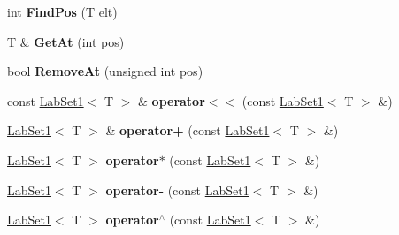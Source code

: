 \begin{DoxyCompactItemize}
\item 
\hypertarget{classelps_1_1_lab_set1_afef2b2ba8157540f4308226054863913}{int {\bfseries Find\+Pos} (T elt)}\label{classelps_1_1_lab_set1_afef2b2ba8157540f4308226054863913}

\item 
\hypertarget{classelps_1_1_lab_set1_a5757cfe7e367a9abeb16cf1055ca7fee}{T \& {\bfseries Get\+At} (int pos)}\label{classelps_1_1_lab_set1_a5757cfe7e367a9abeb16cf1055ca7fee}

\item 
\hypertarget{classelps_1_1_lab_set1_ae8cc5a4eac6599c8374c8fbc97027f33}{bool {\bfseries Remove\+At} (unsigned int pos)}\label{classelps_1_1_lab_set1_ae8cc5a4eac6599c8374c8fbc97027f33}

\item 
\hypertarget{classelps_1_1_lab_set1_a4200ac9d614a09674ee15258ce995864}{const \hyperlink{classelps_1_1_lab_set1}{Lab\+Set1}$<$ T $>$ \& {\bfseries operator$<$$<$} (const \hyperlink{classelps_1_1_lab_set1}{Lab\+Set1}$<$ T $>$ \&)}\label{classelps_1_1_lab_set1_a4200ac9d614a09674ee15258ce995864}

\item 
\hypertarget{classelps_1_1_lab_set1_ab0f93815f027d90c2c34497ab407bfe1}{\hyperlink{classelps_1_1_lab_set1}{Lab\+Set1}$<$ T $>$ \& {\bfseries operator+} (const \hyperlink{classelps_1_1_lab_set1}{Lab\+Set1}$<$ T $>$ \&)}\label{classelps_1_1_lab_set1_ab0f93815f027d90c2c34497ab407bfe1}

\item 
\hypertarget{classelps_1_1_lab_set1_a6e3f33c756193d7f09ba46e2493df7b7}{\hyperlink{classelps_1_1_lab_set1}{Lab\+Set1}$<$ T $>$ {\bfseries operator$\ast$} (const \hyperlink{classelps_1_1_lab_set1}{Lab\+Set1}$<$ T $>$ \&)}\label{classelps_1_1_lab_set1_a6e3f33c756193d7f09ba46e2493df7b7}

\item 
\hypertarget{classelps_1_1_lab_set1_ae4287f8b612e0bb18efac72dbeb23b40}{\hyperlink{classelps_1_1_lab_set1}{Lab\+Set1}$<$ T $>$ {\bfseries operator-\/} (const \hyperlink{classelps_1_1_lab_set1}{Lab\+Set1}$<$ T $>$ \&)}\label{classelps_1_1_lab_set1_ae4287f8b612e0bb18efac72dbeb23b40}

\item 
\hypertarget{classelps_1_1_lab_set1_a2214858a2b61d690631d95a3c6d87c3d}{\hyperlink{classelps_1_1_lab_set1}{Lab\+Set1}$<$ T $>$ {\bfseries operator$^\wedge$} (const \hyperlink{classelps_1_1_lab_set1}{Lab\+Set1}$<$ T $>$ \&)}\label{classelps_1_1_lab_set1_a2214858a2b61d690631d95a3c6d87c3d}

\end{DoxyCompactItemize}
